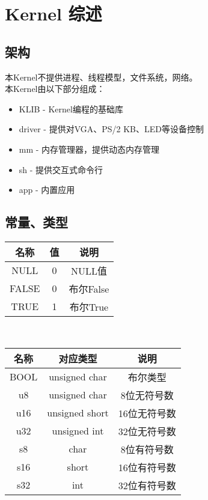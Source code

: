 %
% 
% 
% 
% 
% 
% 
%
\chapter{Kernel 综述}
\section{架构}
本Kernel不提供进程、线程模型，文件系统，网络。\\
本Kernel由以下部分组成：
\begin{itemize}
    \item KLIB - Kernel编程的基础库
    \item driver - 提供对VGA、PS/2 KB、LED等设备控制
    \item mm - 内存管理器，提供动态内存管理
    \item sh - 提供交互式命令行
    \item app - 内置应用
\end{itemize}
\section{常量、类型}
\begin{tabular}{|c|c|c|}
    \hline
    名称 & 值 & 说明\\\hline
    NULL & 0 & NULL值\\\hline
    FALSE & 0 & 布尔False\\\hline
    TRUE & 1 & 布尔True\\\hline
\end{tabular}\\
\begin{tabular}{|c|c|c|}
    \hline
    名称 & 对应类型 & 说明\\\hline
    BOOL & unsigned char & 布尔类型\\\hline
    u8 & unsigned char & 8位无符号数\\\hline
    u16 & unsigned short & 16位无符号数\\\hline
    u32 & unsigned int & 32位无符号数\\\hline
    s8 & char & 8位有符号数\\\hline
    s16 & short & 16位有符号数\\\hline
    s32 & int & 32位有符号数\\\hline
\end{tabular}